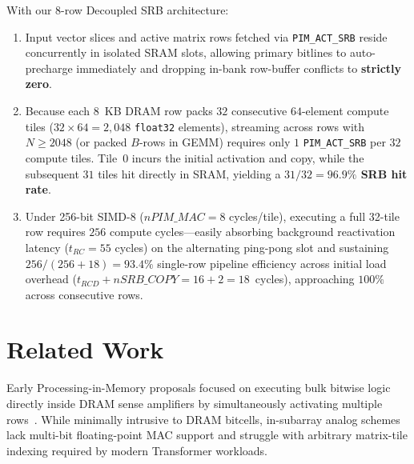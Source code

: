 \documentclass[conference]{IEEEtran}
\begin{document}
With our 8-row Decoupled SRB architecture:
\begin{enumerate}
    \item Input vector slices and active matrix rows fetched via \texttt{PIM\_ACT\_SRB} reside concurrently in isolated SRAM slots, allowing primary bitlines to auto-precharge immediately and dropping in-bank row-buffer conflicts to \textbf{strictly zero}.
    \item Because each $8$~KB DRAM row packs $32$ consecutive $64$-element compute tiles ($32 \times 64 = 2,048$ \texttt{float32} elements), streaming across rows with $N \ge 2048$ (or packed $B$-rows in GEMM) requires only $1$ \texttt{PIM\_ACT\_SRB} per $32$ compute tiles. Tile~$0$ incurs the initial activation and copy, while the subsequent $31$ tiles hit directly in SRAM, yielding a \textbf{$31/32 = 96.9\%$ SRB hit rate}.
    \item Under 256-bit SIMD-8 ($nPIM\_MAC = 8$ cycles/tile), executing a full 32-tile row requires $256$ compute cycles---easily absorbing background reactivation latency ($t_{RC} = 55$ cycles) on the alternating ping-pong slot and sustaining $256 / (256 + 18) = 93.4\%$ single-row pipeline efficiency across initial load overhead ($t_{RCD} + nSRB\_COPY = 16 + 2 = 18$~cycles), approaching $100\%$ across consecutive rows.
\end{enumerate}

\section{Related Work}
\label{sec:related}
Early Processing-in-Memory proposals focused on executing bulk bitwise logic directly inside DRAM sense amplifiers by simultaneously activating multiple rows~\cite{seshadri2013rowclone, seshadri2017ambit}. While minimally intrusive to DRAM bitcells, in-subarray analog schemes lack multi-bit floating-point MAC support and struggle with arbitrary matrix-tile indexing required by modern Transformer workloads.
\end{document}
